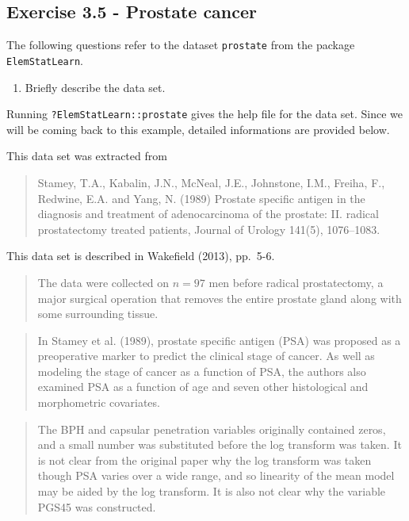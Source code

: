 \documentclass[]{book}
\providecommand{\tightlist}{%
  \setlength{\itemsep}{0pt}\setlength{\parskip}{0pt}}
\theoremstyle{definition}
\theoremstyle{definition}
\theoremstyle{definition}
\theoremstyle{remark}
\begin{document}
\hypertarget{exercise-3.5---prostate-cancer}{%
\subsection{Exercise 3.5 - Prostate
cancer}\label{exercise-3.5---prostate-cancer}}

The following questions refer to the dataset \texttt{prostate} from the
package \texttt{ElemStatLearn}.

\begin{enumerate}
\def\labelenumi{\alph{enumi}.}
\tightlist
\item
  Briefly describe the data set.
\end{enumerate}

Running \texttt{?ElemStatLearn::prostate} gives the help file for the
data set. Since we will be coming back to this example, detailed
informations are provided below.

This data set was extracted from

\begin{quote}
Stamey, T.A., Kabalin, J.N., McNeal, J.E., Johnstone, I.M., Freiha, F.,
Redwine, E.A. and Yang, N. (1989) Prostate specific antigen in the
diagnosis and treatment of adenocarcinoma of the prostate: II. radical
prostatectomy treated patients, Journal of Urology 141(5), 1076--1083.
\end{quote}

This data set is described in Wakefield (2013), pp.~5-6.

\begin{quote}
The data were collected on \(n=97\) men before radical prostatectomy, a
major surgical operation that removes the entire prostate gland along
with some surrounding tissue.
\end{quote}

\begin{quote}
In Stamey et al. (1989), prostate specific antigen (PSA) was proposed as
a preoperative marker to predict the clinical stage of cancer. As well
as modeling the stage of cancer as a function of PSA, the authors also
examined PSA as a function of age and seven other histological and
morphometric covariates.
\end{quote}

\begin{quote}
The BPH and capsular penetration variables originally contained zeros,
and a small number was substituted before the log transform was taken.
It is not clear from the original paper why the log transform was taken
though PSA varies over a wide range, and so linearity of the mean model
may be aided by the log transform. It is also not clear why the variable
PGS45 was constructed.
\end{quote}
\end{document}
